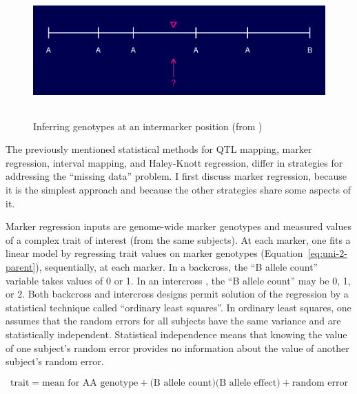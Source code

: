 \documentclass[oneside]{book}\usepackage[]{graphicx}\usepackage[]{color}
\makeatletter
\def\maxwidth{ %
  \ifdim\Gin@nat@width>\linewidth
    \linewidth
  \else
    \Gin@nat@width
  \fi
}
\newenvironment{knitrout}{}{} %
\def\maxwidth{\ifdim\Gin@nat@width>\linewidth\linewidth\else\Gin@nat@width\fi}
\makeatother
\begin{document}
\begin{knitrout}
\color{fgcolor}\begin{figure}
\includegraphics[width=\maxwidth,height=2in]{figure/genoprob1-1} \caption[Inferring genotypes at an intermarker position (from \citet{broman2009guide})]{Inferring genotypes at an intermarker position (from \citet{broman2009guide})}\label{fig:genoprob1}
\end{figure}


\end{knitrout}

The previously mentioned statistical methods for QTL mapping, marker regression, 
interval mapping, and Haley-Knott regression, differ in strategies for addressing 
the ``missing data'' problem. I first discuss marker regression, because it is the 
simplest approach and because the other strategies share some aspects of it.

Marker regression inputs are genome-wide marker genotypes and measured values of a 
complex trait of interest (from the same subjects). 
At each marker, one fits a linear model by regressing trait values on marker 
genotypes (Equation~\ref{eq:uni-2-parent}), sequentially, at each marker. In a 
backcross, the ``B allele count'' variable takes values of 0 or 1. In an intercross
, the ``B allele count'' may be 0, 1, or 2. Both backcross and intercross designs 
permit solution of the regression by a statistical technique called ``ordinary 
least squares''. In ordinary least squares, one assumes that the random errors for 
all subjects have the same variance and are statistically independent. Statistical 
independence means that knowing the value of one subject's random error provides no 
information about the value of another subject's random error.


\begin{equation}
\text{trait} = \text{mean for AA genotype} + \text{(B allele count)}\text{(B allele effect)} + \text{random error}
\label{eq:uni-2-parent}
\end{equation}
\end{document}
